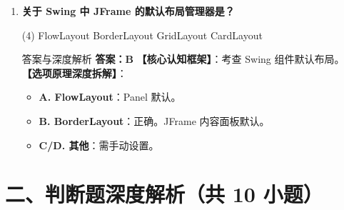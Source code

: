 ﻿\documentclass[12pt, a4paper]{ctexart}
\begin{document}
\begin{enumerate}[label=\textbf{\arabic*.}, itemsep=1em]
	\item \textbf{关于 Swing 中 JFrame 的默认布局管理器是？}
	      \begin{tasks}(4)
		      \task FlowLayout \task BorderLayout \task GridLayout \task CardLayout
	      \end{tasks}
	      \begin{bluebox}{答案与深度解析}
		      \textbf{答案：B}
		      \textbf{【核心认知框架】}：考查 Swing 组件默认布局。
		      \textbf{【选项原理深度拆解】}：
		      \begin{itemize}[leftmargin=*, nosep]
			      \item \textbf{A. FlowLayout}：Panel 默认。
			      \item \textbf{B. BorderLayout}：正确。JFrame 内容面板默认。
			      \item \textbf{C/D. 其他}：需手动设置。
		      \end{itemize}
	      \end{bluebox}
\end{enumerate}

\section*{二、判断题深度解析（共 10 小题）}
\end{document}
